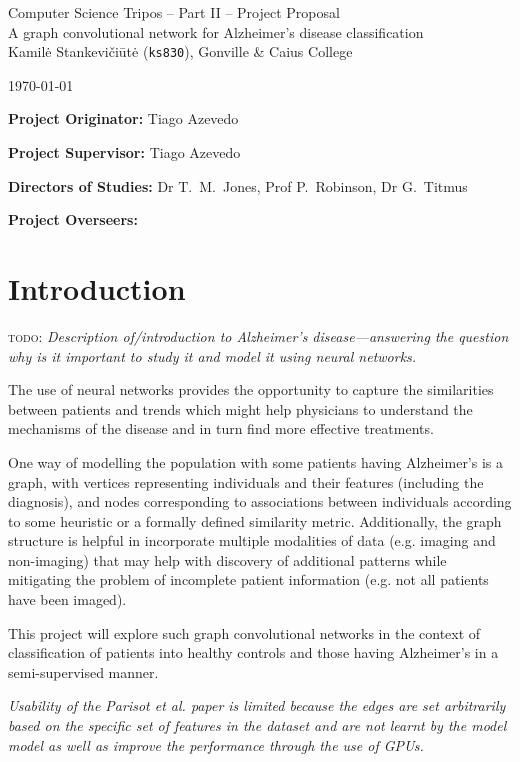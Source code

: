 \documentclass[12pt,a4paper,twoside]{article}
\begin{document}
\begin{center}
\Large
Computer Science Tripos -- Part II -- Project Proposal\\[4mm]
\LARGE
A graph convolutional network for Alzheimer's disease classification\\[4mm]

\large
Kamilė Stankevičiūtė (\texttt{ks830}), Gonville \& Caius College

\today %
\end{center}

\vspace{5mm}
\textbf{Project Originator:} Tiago Azevedo

\textbf{Project Supervisor:} Tiago Azevedo

\textbf{Directors of Studies:} Dr T.~M.~Jones, Prof P.~Robinson, Dr G.~Titmus

\textbf{Project Overseers:} 


\section*{Introduction}

\textsc{todo:} \textit{Description of/introduction to Alzheimer's disease—answering the question why is it important to study it and model it using neural networks.}

The use of neural networks provides the opportunity to capture the similarities between patients and trends which might help physicians to understand the mechanisms of the disease and in turn find more effective treatments. 

One way of modelling the population with some patients having Alzheimer's is a graph, with vertices representing individuals and their features (including the diagnosis), and nodes corresponding to associations between individuals according to some heuristic or a formally defined similarity metric. Additionally, the graph structure is helpful in incorporate multiple modalities of data (e.g. imaging and non-imaging) that may help with discovery of additional patterns while mitigating the problem of incomplete patient information (e.g. not all patients have been imaged). 

This project will explore such graph convolutional networks in the context of  classification of patients into healthy controls and those having Alzheimer's in a semi-supervised manner. 

\textit{Usability of the Parisot et al. paper is limited because the edges are set arbitrarily based on the specific set of features in the dataset and are not learnt by the model model as well as improve the performance through the use of GPUs.}
\end{document}
